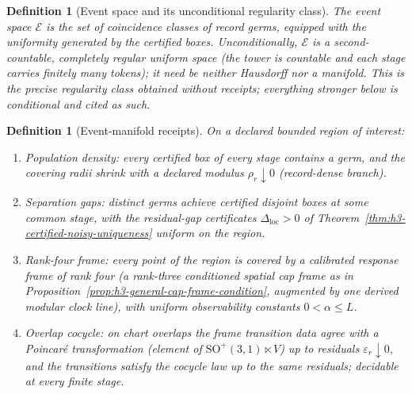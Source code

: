 \documentclass[11pt]{article}
\newtheorem{definition}[theorem]{Definition}
\begin{document}
\begin{definition}[Event space and its unconditional regularity class]
\label{def:event-space}
The \emph{event space} \(\mathcal E\) is the set of coincidence classes of
record germs, equipped with the uniformity generated by the certified boxes.
Unconditionally, \(\mathcal E\) is a second-countable, completely regular
uniform space (the tower is countable and each stage carries finitely many
tokens); it need be neither Hausdorff nor a manifold. This is the precise
regularity class obtained without receipts; everything stronger below is
conditional and cited as such.
\end{definition}

\begin{definition}[Event-manifold receipts]
\label{def:event-manifold-receipts}
On a declared bounded region of interest:
\begin{enumerate}[leftmargin=2em]
\item[\(\mathsf{(E1)}\)] \emph{Population density}: every certified box of
every stage contains a germ, and the covering radii shrink with a declared
modulus \(\rho_r\downarrow0\) (record-dense branch).
\item[\(\mathsf{(E2)}\)] \emph{Separation gaps}: distinct germs achieve
certified disjoint boxes at some common stage, with the residual-gap
certificates \(\Delta_{\mathrm{loc}}>0\) of
Theorem~\ref{thm:h3-certified-noisy-uniqueness} uniform on the region.
\item[\(\mathsf{(E3)}\)] \emph{Rank-four frame}: every point of the region is
covered by a calibrated response frame of rank four (a rank-three
conditioned spatial cap frame as in
Proposition~\ref{prop:h3-general-cap-frame-condition}, augmented by one
derived modular clock line), with uniform observability constants
\(0<\alpha\leq L\).
\item[\(\mathsf{(E4)}\)] \emph{Overlap cocycle}: on chart overlaps the frame
transition data agree with a Poincar\'e transformation
(element of \(\mathrm{SO}^{+}(3,1)\ltimes V\)) up to residuals
\(\varepsilon_r\downarrow0\), and the transitions satisfy the cocycle law up
to the same residuals; decidable at every finite stage.
\end{enumerate}
\end{definition}
\end{document}
